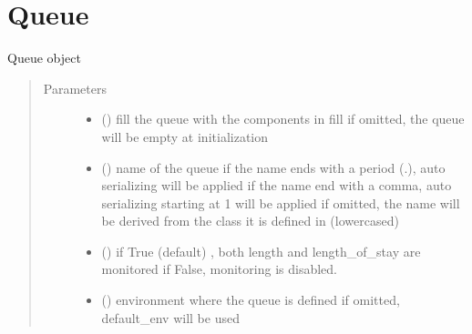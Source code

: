 \documentclass[letterpaper,10pt,english]{sphinxmanual}
\begin{document}
\section{Queue}
\label{\detokenize{Reference:queue}}

\begin{fulllineitems}
\label{\detokenize{Reference:salabim.Queue}}
Queue object
\begin{quote}\begin{description}
\item[{Parameters}] \leavevmode\begin{itemize}
\item {} 
 ({\hyperref[\detokenize{Reference:salabim.Queue}]{}}\sphinxstyleliteralemphasis{\sphinxupquote{, }}) \textendash{} fill the queue with the components in fill 
if omitted, the queue will be empty at initialization

\item {} 
 () \textendash{} name of the queue 
if the name ends with a period (.),
auto serializing will be applied 
if the name end with a comma,
auto serializing starting at 1 will be applied 
if omitted, the name will be derived from the class
it is defined in (lowercased)

\item {} 
 () \textendash{} if True (default) , both length and length\_of\_stay are monitored 
if False, monitoring is disabled.

\item {} 
 ({\hyperref[\detokenize{Reference:salabim.Environment}]{}}) \textendash{} environment where the queue is defined 
if omitted, default\_env will be used

\end{itemize}


\end{description}
\end{quote}
\end{fulllineitems}
\end{document}

